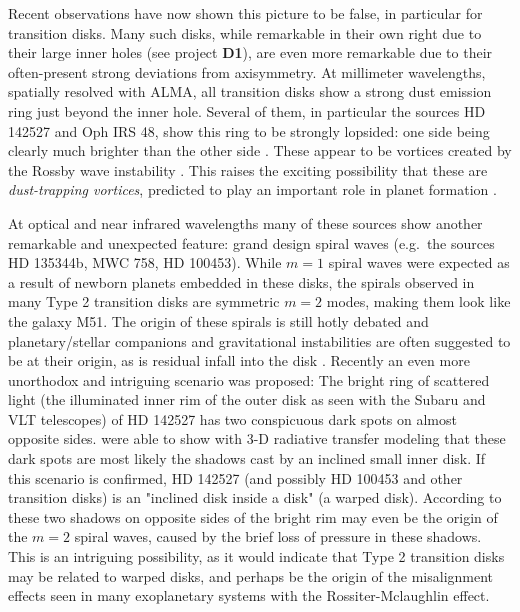 \documentclass[10pt,fleqn,twoside,a4paper]{article}
\begin{document}
Recent observations have now shown this picture to be false, in particular
for transition disks. Many such disks, while remarkable in their own right
due to their large inner holes (see project {\bf D1}), are even more
remarkable due to their often-present strong deviations from axisymmetry. At
millimeter wavelengths, spatially resolved with ALMA, all transition disks
show a strong dust emission ring just beyond the inner hole. Several of
them, in particular the sources HD 142527 and Oph IRS 48, show this ring to
be strongly lopsided: one side being clearly much brighter than the other
side \citep{2013Natur.493..191C,2013Sci...340.1199V}. These appear to be
vortices created by the Rossby wave instability \citep{2012MNRAS.419.1701R}.
This raises the exciting possibility that these are {\em dust-trapping
  vortices}, predicted to play an important role in planet formation
\citep{1995A&A...295L...1B,1997Icar..128..213K}.

At optical and near infrared wavelengths many of these sources show another
remarkable and unexpected feature: grand design spiral waves (e.g.~the
sources HD 135344b, MWC 758, HD 100453). While $m=1$ spiral waves were
expected as a result of newborn planets embedded in these disks, the spirals
observed in many Type 2 transition disks are symmetric $m=2$ modes, making
them look like the galaxy M51. The origin of these spirals is still hotly
debated and planetary/stellar companions \citep{2016ApJ...816L..12D} and
gravitational instabilities \citep{2016arXiv161109361T} are often suggested
to be at their origin, as is residual infall into the disk
\citep{2015A&A...582L...9L}. Recently an even more unorthodox and intriguing
scenario was proposed: The bright ring of scattered light (the illuminated
inner rim of the outer disk as seen with the Subaru and VLT telescopes) of
HD 142527 has two conspicuous dark spots on almost opposite
sides. \citet{2015ApJ...798L..44M} were able to show with 3-D radiative
transfer modeling that these dark spots are most likely the shadows cast by
an inclined small inner disk. If this scenario is confirmed, HD 142527 (and
possibly HD 100453 and other transition disks) is an "inclined disk inside a
disk" (a warped disk). According to \citet{2016ApJ...823L...8M} these two
shadows on opposite sides of the bright rim may even be the origin of the
$m=2$ spiral waves, caused by the brief loss of pressure in these shadows.
This is an intriguing possibility, as it would indicate that Type 2
transition disks may be related to warped disks, and perhaps be the origin
of the misalignment effects seen in many exoplanetary systems with the
Rossiter-Mclaughlin effect.
\end{document}
